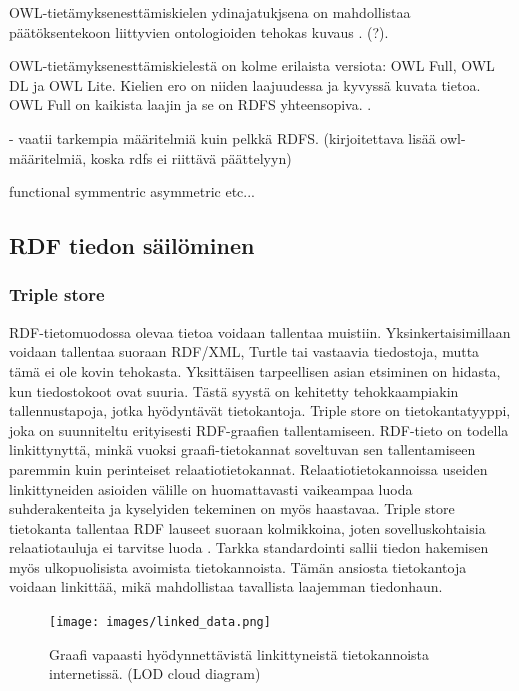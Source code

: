 \documentclass[finnish, 12pt, a4paper, elec, utf8, pdfa, online]{aaltothesis}
\begin{document}
OWL-tietämyksenesttämiskielen ydinajatukjsena on mahdollistaa päätöksentekoon liittyvien ontologioiden tehokas kuvaus \cite{revisited}. (?).

OWL-tietämyksenesttämiskielestä on kolme erilaista versiota: OWL Full, OWL DL ja OWL Lite. Kielien ero on niiden laajuudessa ja kyvyssä kuvata tietoa. OWL Full on kaikista laajin ja se on RDFS yhteensopiva. \cite{OWL_specification}.

- vaatii tarkempia määritelmiä kuin pelkkä RDFS. (kirjoitettava lisää owl-määritelmiä, koska rdfs ei riittävä päättelyyn)

functional
symmentric
asymmetric
etc...

\subsection{RDF tiedon säilöminen}


\subsubsection{Triple store}
RDF-tietomuodossa olevaa tietoa voidaan tallentaa muistiin. Yksinkertaisimillaan voidaan tallentaa suoraan RDF/XML, Turtle tai vastaavia tiedostoja, mutta tämä ei ole kovin tehokasta. Yksittäisen tarpeellisen asian etsiminen on hidasta, kun tiedostokoot ovat suuria. Tästä syystä on kehitetty tehokkaampiakin tallennustapoja, jotka hyödyntävät tietokantoja. Triple store on tietokantatyyppi, joka on suunniteltu erityisesti RDF-graafien tallentamiseen. RDF-tieto on todella linkittynyttä, minkä vuoksi graafi-tietokannat soveltuvan sen tallentamiseen paremmin kuin perinteiset relaatiotietokannat. Relaatiotietokannoissa useiden linkittyneiden asioiden välille on huomattavasti vaikeampaa luoda suhderakenteita ja kyselyiden tekeminen on myös haastavaa. Triple store tietokanta tallentaa RDF lauseet suoraan kolmikkoina, joten sovelluskohtaisia relaatiotauluja ei tarvitse luoda \cite{triplestore}. Tarkka standardointi sallii tiedon hakemisen myös ulkopuolisista avoimista tietokannoista. Tämän ansiosta tietokantoja voidaan linkittää, mikä mahdollistaa tavallista laajemman tiedonhaun.

\begin{figure}[htb]
\centering
\texttt{[image: images/linked\_data.png]}
\caption{Graafi vapaasti hyödynnettävistä linkittyneistä tietokannoista internetissä. (LOD cloud diagram) \cite{LOD_cloud} \label{images/linked_data}}
\end{figure}
\end{document}
